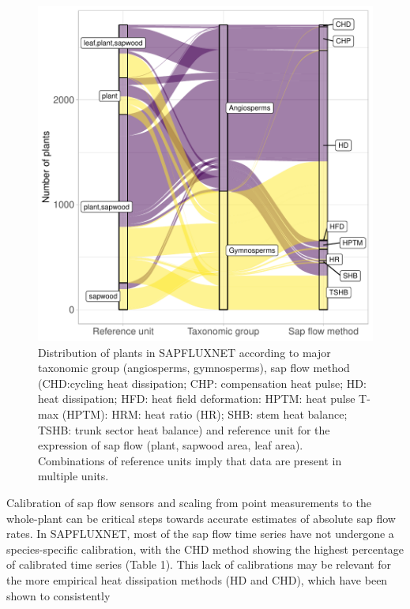 \documentclass[11pt,twoside]{reedthesis}
\begin{document}
\setlength{\abovecaptionskip}{0pt}
\begin{figure}[hbt!]

{\centering \includegraphics[width=1\linewidth]{figure/CH3/Figure4} 

}

\caption[Distribution of plants according to major taxonomic group and sap flow method.]{Distribution of plants in SAPFLUXNET according to major taxonomic group (angiosperms, gymnosperms), sap flow method (CHD:cycling heat dissipation; CHP: compensation heat pulse; HD: heat dissipation; HFD: heat field deformation: HPTM: heat pulse T-max (HPTM): HRM: heat ratio (HR); SHB: stem heat balance; TSHB: trunk sector heat balance) and reference unit for the expression of sap flow (plant, sapwood area, leaf area). Combinations of reference units imply that data are present in multiple units.}\label{fig:Ch2plot4}
\end{figure}
Calibration of sap flow sensors and scaling from point measurements to
the whole-plant can be critical steps towards accurate estimates of
absolute sap flow rates. In SAPFLUXNET, most of the sap flow time series
have not undergone a species-specific calibration, with the CHD method
showing the highest percentage of calibrated time series (Table 1). This
lack of calibrations may be relevant for the more empirical heat
dissipation methods (HD and CHD), which have been shown to consistently
\end{document}
